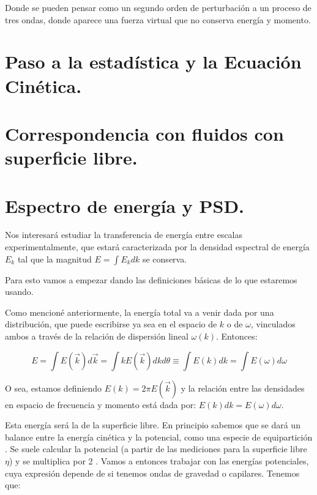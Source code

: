 Donde se pueden pensar como un segundo orden de perturbación a un proceso de tres ondas, donde aparece una fuerza virtual que no conserva energía y momento. 

\section{Paso a la estadística y la Ecuación Cinética.}





\section{Correspondencia con fluidos con superficie libre.}



\section{Espectro de energía y PSD.}
Nos interesará estudiar la transferencia de energía entre escalas experimentalmente, que estará caracterizada por la densidad espectral de energía $E_k$ tal que la magnitud $E = \int E_k dk$ se conserva. 

Para esto vamos a empezar dando las definiciones básicas de lo que estaremos usando.

Como mencioné anteriormente, la energía total va a venir dada por una distribución, que puede escribirse ya sea en el espacio de $k$ o de $\omega$, vinculados ambos a través de la relación de dispersión lineal $\omega(k)$. Entonces:

\begin{equation}
	E = \int E(\vec k) d\vec k = \int k E(\vec k) dkd\theta \equiv \int E(k) dk = \int E(\omega) d\omega
\end{equation}

O sea, estamos definiendo $E(k) = 2\pi E(\vec k)$ y la relación entre las densidades en espacio de frecuencia y momento está dada por: $E(k) dk = E(\omega) d\omega$.

Esta energía será la de la superficie libre. En principio sabemos que se dará un balance entre la energía cinética y la potencial, como una especie de equipartición \cite{kunduFluidMechanics2014}. Se suele calcular la potencial (a partir de las mediciones para la superficie libre $\eta$) y se multiplica por 2 \cite{deikeEtudesExperimentalesNumeriques2013}. Vamos a entonces trabajar con las energías potenciales, cuya expresión depende de si tenemos ondas de gravedad o capilares. Tenemos que:

